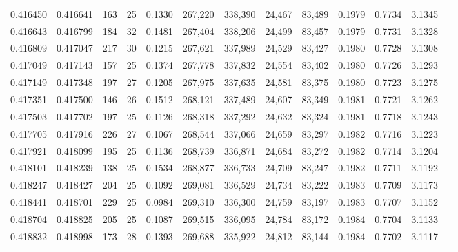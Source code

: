 \begin{tabular}{rrrrrrrrrrrrr}
0.416450 & 0.416641 &   163 &  25 &                                     0.1330 & 267,220 & 338,390 &  24,467 &  83,489 & 0.1979 & 0.7734 & 3.1345 \\
0.416643 & 0.416799 &   184 &  32 &                                     0.1481 & 267,404 & 338,206 &  24,499 &  83,457 & 0.1979 & 0.7731 & 3.1328 \\
0.416809 & 0.417047 &   217 &  30 &                                     0.1215 & 267,621 & 337,989 &  24,529 &  83,427 & 0.1980 & 0.7728 & 3.1308 \\
0.417049 & 0.417143 &   157 &  25 &                                     0.1374 & 267,778 & 337,832 &  24,554 &  83,402 & 0.1980 & 0.7726 & 3.1293 \\
0.417149 & 0.417348 &   197 &  27 &                                     0.1205 & 267,975 & 337,635 &  24,581 &  83,375 & 0.1980 & 0.7723 & 3.1275 \\
0.417351 & 0.417500 &   146 &  26 &                                     0.1512 & 268,121 & 337,489 &  24,607 &  83,349 & 0.1981 & 0.7721 & 3.1262 \\
0.417503 & 0.417702 &   197 &  25 &                                     0.1126 & 268,318 & 337,292 &  24,632 &  83,324 & 0.1981 & 0.7718 & 3.1243 \\
0.417705 & 0.417916 &   226 &  27 &                                     0.1067 & 268,544 & 337,066 &  24,659 &  83,297 & 0.1982 & 0.7716 & 3.1223 \\
0.417921 & 0.418099 &   195 &  25 &                                     0.1136 & 268,739 & 336,871 &  24,684 &  83,272 & 0.1982 & 0.7714 & 3.1204 \\
0.418101 & 0.418239 &   138 &  25 &                                     0.1534 & 268,877 & 336,733 &  24,709 &  83,247 & 0.1982 & 0.7711 & 3.1192 \\
0.418247 & 0.418427 &   204 &  25 &                                     0.1092 & 269,081 & 336,529 &  24,734 &  83,222 & 0.1983 & 0.7709 & 3.1173 \\
0.418441 & 0.418701 &   229 &  25 &                                     0.0984 & 269,310 & 336,300 &  24,759 &  83,197 & 0.1983 & 0.7707 & 3.1152 \\
0.418704 & 0.418825 &   205 &  25 &                                     0.1087 & 269,515 & 336,095 &  24,784 &  83,172 & 0.1984 & 0.7704 & 3.1133 \\
0.418832 & 0.418998 &   173 &  28 &                                     0.1393 & 269,688 & 335,922 &  24,812 &  83,144 & 0.1984 & 0.7702 & 3.1117 \\

\end{tabular}
